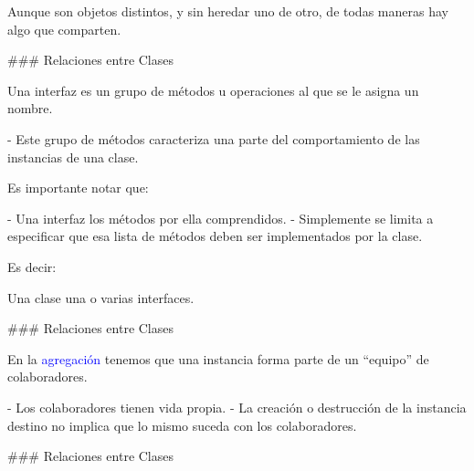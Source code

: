 Aunque son objetos distintos, y sin heredar uno de otro, de todas maneras hay algo que comparten.

### Relaciones entre Clases

\newline

Una interfaz es un grupo de métodos u operaciones al que se le asigna un nombre.

- Este grupo de métodos caracteriza una parte del comportamiento de las instancias de una clase.

Es importante notar que:

- Una interfaz  los métodos por ella comprendidos.
- Simplemente se limita a especificar que esa lista de métodos deben ser implementados
por la clase.

Es decir:
\vspace{-1em}
\begin{center}\hspace{60mm}\begin{customRoundedBox}{}
\centering Una clase  una o varias interfaces.
\end{customRoundedBox}\end{center}


### Relaciones entre Clases

\newline

\vspace{-1em}
\columnsbegin


En la \textcolor{blue}{agregación} tenemos que una instancia forma parte
de un ``equipo'' de colaboradores.

- Los colaboradores tienen vida propia.
- La creación o destrucción de la instancia destino no implica que lo mismo
suceda con los colaboradores.


\centering{}

\columnsend

### Relaciones entre Clases

\newline

